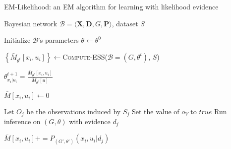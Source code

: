 \documentclass[11pt]{article}
\begin{document}
\begin{algorithm*}[h!]
\caption{EM-Likelihood: an EM algorithm for learning with likelihood evidence}
\label{alg:EM-Likelihood-Complete data}
\vspace{-10pt}
\begin{multicols}{2}
\begin{algorithmic}[1] 
\Require Bayesian network $\mathcal{B}=\langle \mathbf{X},\mathbf{D}, G, \mathbf{P} \rangle$, dataset $S$ 

\State Initialize $\mathcal{B}$'s parameters $\theta \leftarrow \theta^0$

  \State $\left\{ \bar{M}_{\theta^t}[x_{i},u_{i}]\right\} \leftarrow$\textsc{Compute-ESS}($\mathcal{B}=(G,\theta^{t})$, $S$)



      \State $\theta_{x_{i}|u_{i}}^{t+1}=\frac{\bar{M}_{\theta^{t}}[x_{i},u_{i}]}{\bar{M}_{\theta^{t}}[u]}$
    \EndFor
  \EndFor
\EndFor
\EndProcedure
\\

   \State $\bar{M}[x_{i},u_{i}]\leftarrow 0$
  \EndFor
\EndFor


    \State Let $O_j$ be the observations induced by $S_j$
      \State Set the value of $o_V$ to $true$
    \EndFor
    \State Run inference on $(G,\theta)$ with evidence $d_{j}$
    
        \State $\bar{M}[x_{i},u_{i}] \mathrel{{+}{=}} P_{(G',\theta')}(x_{i},u_{i}|d_{j})$
    
      \EndFor
    \EndFor
\EndFor
\EndFunction
\end{algorithmic}
\end{multicols}
\end{algorithm*}
\end{document}
